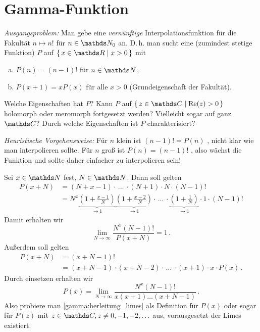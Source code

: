 \section{Gamma-Funktion}

\emph{Ausgangsproblem:} Man gebe eine \emph{vernünftige} Interpolationsfunktion für die Fakultät $n\mapsto n!$ für $n\in\NN_0$ an.
D.\,h. man sucht eine (zumindest stetige Funktion) $P$ auf $\Set{x\in\RR \mid x > 0}$ mit
\begin{enumerate}[a)]
\item $P(n) = (n-1)!$ für $n\in\NN$,
\item $P(x+1) = xP(x)$ für alle $x>0$ (Grundeigenschaft der Fakultät).
\end{enumerate}

\noindent Welche Eigenschaften hat $P$?
Kann $P$ auf $\Set{z\in\CC \mid \Re(z) > 0}$ holomorph oder meromorph fortgesetzt werden?
Vielleicht sogar auf ganz $\CC$?
Durch welche Eigenschaften ist $P$ charakterisiert?

\emph{Heuristische Vorgehensweise:} %
Für $n$ klein ist $(n-1)! = P(n)$ , nicht klar wie man interpolieren sollte.
Für $n$ groß ist $P(n) = (n-1)!$ , also wächst die Funktion und sollte daher einfacher zu interpolieren sein!

Sei $x\in\NN$ fest, $N\in\NN$.
Dann soll gelten
\begin{align*}
	P(x+N)
	&= (N+x-1)\cdot\,\ldots\,\cdot(N+1)\cdot N \cdot (N-1)! \\
	&= N^x\underbrace{\left(1+\frac{x-1}{N}\right)}_{\to 1}\underbrace{\left(1+\frac{x-2}{N}\right)}_{\to 1} \cdot\,\ldots\,\cdot \underbrace{\left(1+\frac{1}{N}\right)}_{\to 1}\cdot 1 \cdot (N-1)!
\end{align*}
Damit erhalten wir
\[
	\lim_{N\to\infty} \frac{N^x(N-1)!}{P(x+N)}
	= 1
	\,.
\]
Außerdem soll gelten
\begin{align*}
	P(x+N)
	&= (x + N -1)! \\
	&= (x + N -1)\cdot(x+N-2)\cdot\,\ldots\,\cdot (x+1)\cdot x\cdot P(x)
	\,.
\end{align*}
Durch einsetzen erhalten wir
\begin{equation}\label{gamma:herleitung_limes}
	P(x)
	= \lim _ {N\to\infty} \frac{N^x(N-1)!}{x(x+1)\ldots(x+N-1)}
	\,.
\end{equation}
Also probiere man \eqref{gamma:herleitung_limes} als Definition für $P(x)$ oder sogar für $P(z)$ mit $z\in\CC, z \not= 0, -1, -2, \ldots$ aus, vorausgesetzt der Limes existiert.

